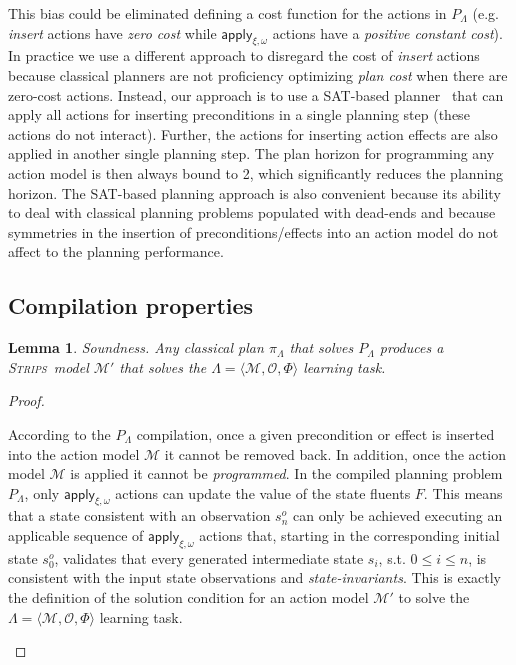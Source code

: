 \documentclass{article}
\newcommand{\tup}[1]{{\langle #1 \rangle}}
\newcommand{\strips}{\textsc{Strips}}
\newtheorem{mylemma}[mytheorem]{Lemma}
\begin{document}
This bias could be eliminated defining a cost function for the actions in $P_\Lambda$ (e.g. {\em insert} actions have {\em zero cost} while $\mathsf{apply_{\xi,\omega}}$ actions have a {\em positive constant cost}). In practice we use a different approach to disregard the cost of {\em insert} actions because classical planners are not proficiency optimizing {\em plan cost} when there are zero-cost actions. Instead, our approach is to use a SAT-based planner~\cite{rintanen2014madagascar} that can apply all actions for inserting preconditions in a single planning step (these actions do not interact). Further, the actions for inserting action effects are also applied in another single planning step. The plan horizon for programming any action model is then always bound to 2, which significantly reduces the planning horizon. The SAT-based planning approach is also convenient because its ability to deal with classical planning problems populated with dead-ends and because symmetries in the insertion of preconditions/effects into an action model do not affect to the planning performance. 

\subsection{Compilation properties}
\begin{mylemma}
Soundness. Any classical plan $\pi_{\Lambda}$ that solves $P_{\Lambda}$ produces a \strips\ model $\mathcal{M'}$ that solves the $\Lambda=\tup{\mathcal{M},{\mathcal O},\Phi}$ learning task.
\end{mylemma}

\begin{proof}[Proof]
\begin{small}
According to the $P_{\Lambda}$ compilation, once a given precondition or effect is inserted into the action model $\mathcal{M}$ it cannot be removed back. In addition, once the action model $\mathcal{M}$ is applied it cannot be {\em programmed}. In the compiled planning problem $P_{\Lambda}$, only $\mathsf{apply_{\xi,\omega}}$ actions can update the value of the state fluents $F$. This means that a state consistent with an observation $s_n^o$ can only be achieved executing an applicable sequence of $\mathsf{apply_{\xi,\omega}}$ actions that, starting in the corresponding initial state $s_0^o$, validates that every generated intermediate state $s_i$, s.t. $0\leq i\leq n$, is consistent with the input state observations and {\em state-invariants}. This is exactly the definition of the solution condition for an action model $\mathcal{M}'$ to solve the $\Lambda=\tup{\mathcal{M},{\mathcal O},\Phi}$ learning task. 
\end{small}
\end{proof}
\end{document}
